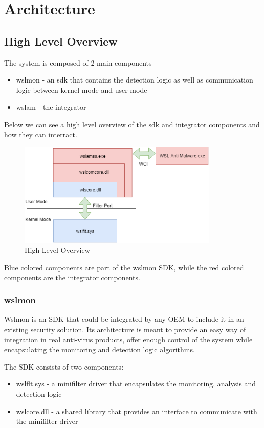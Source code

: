 \chapter{Architecture}
    \section{High Level Overview}
        The system is composed of 2 main components
        \begin{itemize}
            \item wslmon - an sdk that contains the detection logic as well as communication logic between kernel-mode and user-mode
            \item wslam - the integrator
        \end{itemize}

        Below we can see a high level overview of the sdk and integrator components and how they can interract.
        
        \begin{figure}[H]
            \includegraphics[width=360px, keepaspectratio]{img/high_level_overview_diagram.png}
            \caption{High Level Overview}
            \label{fig:high_level_overview_diagram}
        \end{figure}

        Blue colored components are part of the wslmon SDK, while the red colored components are the integrator components.
    
    \subsection{wslmon}
        Wslmon is an SDK that could be integrated by any OEM to include it in an existing security solution. Its
        architecture is meant to provide an easy way of integration in real anti-virus products, offer enough control of the system while
        encapsulating the monitoring and detection logic algorithms.

        The SDK consists of two components:
        \begin{itemize}
            \item wslflt.sys - a minifilter driver that encapsulates the monitoring, analysis and detection logic
            \item wslcore.dll - a shared library that provides an interface to communicate with the minifilter driver
        \end{itemize}

